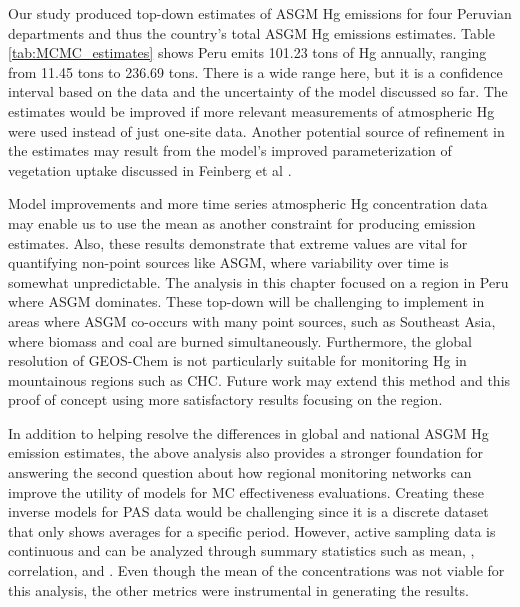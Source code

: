 \begin{flushleft}

 Our study produced top-down estimates of ASGM Hg emissions for four Peruvian departments and thus the country's total ASGM Hg emissions estimates. Table \ref{tab:MCMC_estimates} shows Peru emits 101.23 tons of Hg annually, ranging from 11.45 tons to 236.69 tons. There is a wide range here, but it is a confidence interval based on the data and the uncertainty of the model discussed so far. The estimates would be improved if more relevant measurements of atmospheric Hg were used instead of just one-site data. Another potential source of refinement in the estimates may result from the model's improved parameterization of vegetation uptake discussed in Feinberg et al \cite{feinberg_evaluating_2022}.
  \end{flushleft}
  
  \begin{flushleft}
  Model improvements and more time series atmospheric Hg concentration data may enable us to use the mean as another constraint for producing \hg emission estimates.  Also, these results demonstrate that extreme values are vital for quantifying non-point sources like ASGM, where variability over time is somewhat unpredictable. The analysis in this chapter focused on a region in Peru where ASGM dominates. These top-down will be challenging to implement in areas where ASGM co-occurs with many point sources, such as Southeast Asia, where biomass and coal are burned simultaneously. Furthermore, the global resolution of GEOS-Chem is not particularly suitable for monitoring Hg in mountainous regions such as CHC. Future work may extend this method and this proof of concept using more satisfactory results focusing on the region. 
   \end{flushleft}
  
  \begin{flushleft}
  In addition to helping resolve the differences in global and national ASGM Hg emission estimates, the above analysis also provides a stronger foundation for answering the second question about how regional monitoring networks can improve the utility of models for MC effectiveness evaluations. Creating these inverse models for PAS data would be challenging since it is a discrete dataset that only shows averages for a specific period. However, active sampling data is continuous and can be analyzed through summary statistics such as mean, \iq, correlation, and \nft. Even though the mean of the concentrations was not viable for this analysis, the other metrics were instrumental in generating the results.
\end{flushleft}



